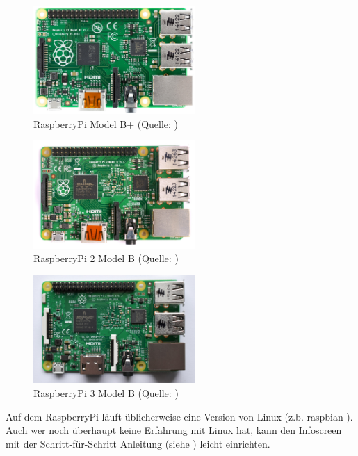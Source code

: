 \begin{figure}[h!]
	\centering
		\includegraphics[width=0.55\textwidth]{./fotos/Raspberry_Pi_B+_top.jpg}
	\caption{RaspberryPi Model B+ (Quelle: \cite{rpibplus})}
	\label{fig:rpibplus}
\end{figure}

\begin{figure}[h!]
	\centering
		\includegraphics[width=0.55\textwidth]{./fotos/Raspberry_Pi_2_Model_B_v1-1_top_new.jpg}
	\caption{RaspberryPi 2 Model B (Quelle: \cite{rpi2b})}
	\label{fig:rpi2b}
\end{figure}

\begin{figure}[h!]
	\centering
		\includegraphics[width=0.55\textwidth]{./fotos/Raspberry_Pi_3_Model_B.jpg}
	\caption{RaspberryPi 3 Model B (Quelle: \cite{rpi3b})}
	\label{fig:rpi3b}
\end{figure}

\clearpage

Auf dem RaspberryPi läuft üblicherweise eine Version von Linux (z.b. raspbian \cite{raspbian}).
Auch wer noch überhaupt keine Erfahrung mit Linux hat, kann den Infoscreen mit der Schritt-für-Schritt Anleitung (siehe ) leicht einrichten.

